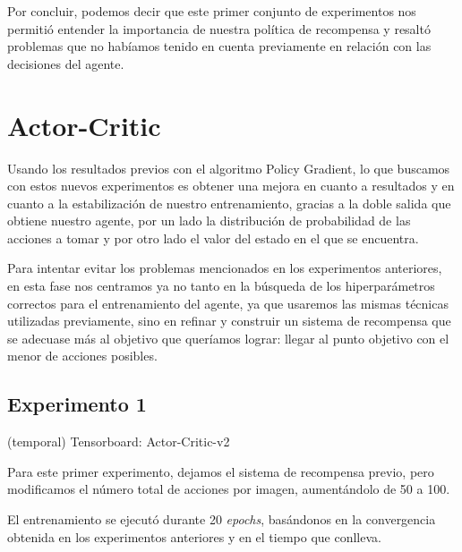 Por concluir, podemos decir que este primer conjunto de experimentos nos permitió entender la importancia de nuestra política de recompensa y resaltó problemas que no habíamos tenido en cuenta previamente en relación con las decisiones del agente.
\medskip


\section{Actor-Critic}
\label{resultados-actor-critic}

Usando los resultados previos con el algoritmo Policy Gradient, lo que buscamos con estos nuevos experimentos es obtener una mejora en cuanto a resultados y en cuanto a la estabilización de nuestro entrenamiento, gracias a la doble salida que obtiene nuestro agente, por un lado la distribución de probabilidad de las acciones a tomar y por otro lado el valor del estado en el que se encuentra.
\medskip

Para intentar evitar los problemas mencionados en los experimentos anteriores, en esta fase nos centramos ya no tanto en la búsqueda de los hiperparámetros correctos para el entrenamiento del agente, ya que usaremos las mismas técnicas utilizadas previamente, sino en refinar y construir un sistema de recompensa que se adecuase más al objetivo que queríamos lograr: llegar al punto objetivo con el menor de acciones posibles.
\medskip

\subsection{Experimento 1}
\label{resultados-actor-critic-experimento-1}

(temporal) Tensorboard: Actor-Critic-v2

Para este primer experimento, dejamos el sistema de recompensa previo, pero modificamos el número total de acciones por imagen, aumentándolo de 50 a 100.
\medskip

El entrenamiento se ejecutó durante 20 \textit{epochs}, basándonos en la convergencia obtenida en los experimentos anteriores y en el tiempo que conlleva.
\medskip

